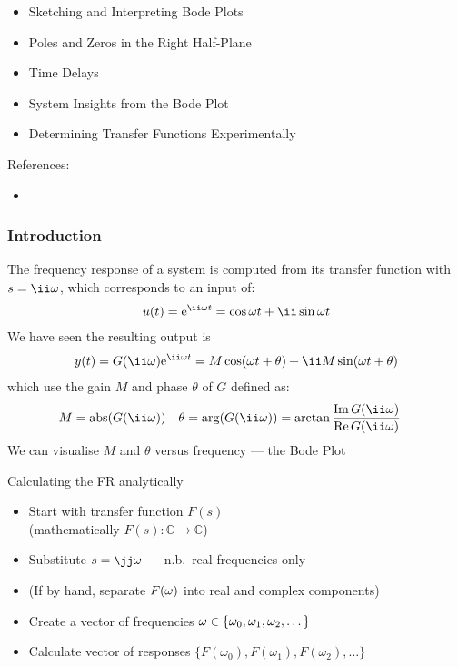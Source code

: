 \documentclass{beamer-control}
\begin{document}

\begin{SUMMARY}
\begin{itemize}
\item Sketching and Interpreting Bode Plots
\item Poles and Zeros in the Right Half-Plane
\item Time Delays
\item System Insights from the Bode Plot
\item Determining Transfer Functions Experimentally
\end{itemize}
\vfill References:
\begin{itemize}
\item {}
\end{itemize}
\end{SUMMARY}


\begin{frame}
\frametitle{Introduction}
The \alert{frequency response} of a system is computed from its transfer function with $s=\ii\ww$, which corresponds to an input of:
\begin{align}
u(t) = \Exp{\ii\ww t} = \cos \ww t + \ii \sin \ww t
\end{align}
We have seen the resulting output is
\begin{align}
y(t) = G(\ii\ww)\Exp{\ii\ww t} = M\cos(\ww t+\theta) + \ii M \sin(\ww t + \theta)
\end{align}
which use the gain $M$ and phase $\theta$ of $G$ defined as:
\begin{align}
M &= \abs (G(\ii\ww)) & \theta &= \arg( G(\ii\ww)) = \arctan \frac{\Imag G(\ii\ww)}{\Real G(\ii\ww)}
\end{align}
We can visualise $M$ and $\theta$ versus frequency --- the Bode Plot
\end{frame}

\begin{frame}{Calculating the FR analytically}
  \begin{itemize}
    \item  Start with transfer function $F(s)$\\ (mathematically $F(s)\colon\mathbb{C}\to\mathbb{C}$)
    \item  Substitute $s=\jj\ww$ \qquad --- n.b.\ real frequencies only
    \item  (If by hand, separate $F(\omega)$ into real and complex components)
    \item  Create a vector of frequencies $\omega\in\{\omega_0,\omega_1,\omega_2,\dots\}$
    \item  Calculate vector of responses $\bigl\{F(\omega_0),F(\omega_1),F(\omega_2),\dots\bigr\}$
  \end{itemize}
\end{frame}
\end{document}
